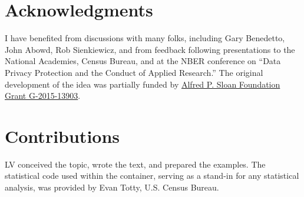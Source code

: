 \documentclass[inline]{hdsr}
\begin{document}
\section*{Acknowledgments}

I have benefited from discussions with many folks, including Gary Benedetto, John Abowd, Rob Sienkiewicz, and from feedback following presentations to the National Academies, Census Bureau, and at the NBER conference on ``Data Privacy Protection and the Conduct of Applied Research.'' The original development of the idea was partially funded by \href{https://sloan.org/grant-detail/6845}{Alfred P. Sloan Foundation Grant G-2015-13903}.

\section*{Contributions}

LV conceived the topic, wrote the text, and prepared the examples. The statistical code used within the container, serving as a stand-in for any statistical analysis, was provided by Evan Totty, U.S. Census Bureau.  


\appendix




\printbibliography


\end{document}
